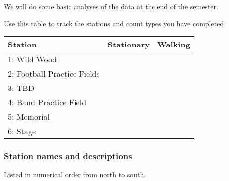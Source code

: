 \documentclass[12pt]{article}
\begin{document}
We will do some basic analyses of the data at the end of the semester.

Use this table to track the stations and count types you have completed.

\begin{tabular}{lcc}

\toprule

Station & Stationary & Walking \tabularnewline

\midrule

1: Wild Wood & & \tabularnewline

\midrule

2: Football Practice Fields & & \tabularnewline

\midrule

3: TBD & & \tabularnewline

\midrule

4: Band Practice Field & & \tabularnewline

\midrule

5: Memorial  & & \tabularnewline

\midrule

6: Stage & & \tabularnewline

\bottomrule

\end{tabular}

\newpage

\subsubsection*{Station names and descriptions}

Listed in numerical order from north to south. 
\end{document}
